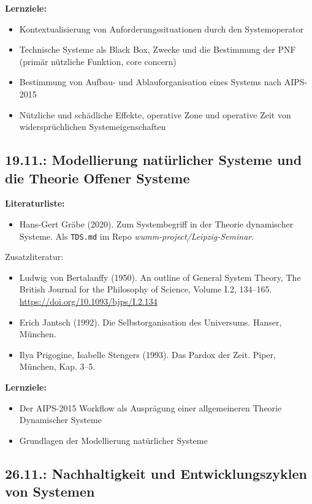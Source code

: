 \documentclass[11pt,a4paper]{article}
\begin{document}
\textbf{Lernziele:}
\begin{itemize}[noitemsep]
\item Kontextualisierung von Anforderungssituationen durch den Systemoperator 
\item Technische Systeme als Black Box, Zwecke und die Bestimmung der PNF
  (primär nützliche Funktion, core concern)
\item Bestimmung von Aufbau- und Ablauforganisation eines Systems nach
  AIPS-2015 
\item Nützliche und schädliche Effekte, operative Zone und operative Zeit von
  widersprüch\-lichen Systemeigenschaften
\end{itemize}

\subsection{19.11.: Modellierung natürlicher Systeme und die Theorie Offener
  Systeme}

\textbf{Literaturliste:}
\begin{itemize}
\item Hans-Gert Gräbe (2020).  Zum Systembegriff in der Theorie dynamischer
  Systeme.  Als \texttt{TDS.md} im Repo \emph{wumm-project/Leipzig-Seminar}.
\end{itemize}
Zusatzliteratur:
\begin{itemize}
\item Ludwig von Bertalanffy (1950). An outline of General System Theory, The
  British Journal for the Philosophy of Science, Volume I.2, 134–165.
  \url{https://doi.org/10.1093/bjps/I.2.134}
\item Erich Jantsch (1992). Die Selbstorganisation des Universums. Hanser,
  München.
\item Ilya Prigogine, Isabelle Stengers (1993). Das Pardox der Zeit. Piper,
  München, Kap. 3--5.
\end{itemize}

\textbf{Lernziele:}
\begin{itemize}[noitemsep]
\item Der AIPS-2015 Workflow als Ausprägung einer allgemeineren Theorie
  Dynamischer Systeme 
\item Grundlagen der Modellierung natürlicher Systeme
\end{itemize}

\subsection{26.11.: Nachhaltigkeit und Entwicklungszyklen von Systemen}
\end{document}
